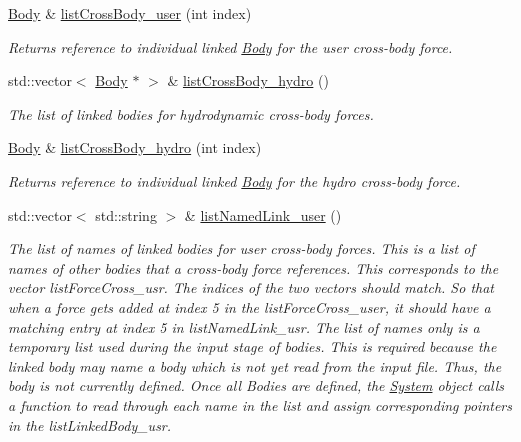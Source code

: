 \begin{DoxyCompactItemize}
\hyperlink{classosea_1_1ofreq_1_1_body}{Body} \& \hyperlink{classosea_1_1ofreq_1_1_body_afaf64ab1b477ff157f31e6824be1b767}{list\-Cross\-Body\-\_\-user} (int index)
\begin{DoxyCompactList}\small\item\em Returns reference to individual linked \hyperlink{classosea_1_1ofreq_1_1_body}{Body} for the user cross-\/body force. \end{DoxyCompactList}\item 
std\-::vector$<$ \hyperlink{classosea_1_1ofreq_1_1_body}{Body} $\ast$ $>$ \& \hyperlink{classosea_1_1ofreq_1_1_body_a7c930213d83962d4248068c38c589113}{list\-Cross\-Body\-\_\-hydro} ()
\begin{DoxyCompactList}\small\item\em The list of linked bodies for hydrodynamic cross-\/body forces. \end{DoxyCompactList}\item 
\hyperlink{classosea_1_1ofreq_1_1_body}{Body} \& \hyperlink{classosea_1_1ofreq_1_1_body_a9aaac9391781c67198f7b8b5785d4745}{list\-Cross\-Body\-\_\-hydro} (int index)
\begin{DoxyCompactList}\small\item\em Returns reference to individual linked \hyperlink{classosea_1_1ofreq_1_1_body}{Body} for the hydro cross-\/body force. \end{DoxyCompactList}\item 
std\-::vector$<$ std\-::string $>$ \& \hyperlink{classosea_1_1ofreq_1_1_body_a07d8ed6fdf5a4c6ef73b2d39b58403ce}{list\-Named\-Link\-\_\-user} ()
\begin{DoxyCompactList}\small\item\em The list of names of linked bodies for user cross-\/body forces. This is a list of names of other bodies that a cross-\/body force references. This corresponds to the vector list\-Force\-Cross\-\_\-usr. The indices of the two vectors should match. So that when a force gets added at index 5 in the list\-Force\-Cross\-\_\-user, it should have a matching entry at index 5 in list\-Named\-Link\-\_\-usr. The list of names only is a temporary list used during the input stage of bodies. This is required because the linked body may name a body which is not yet read from the input file. Thus, the body is not currently defined. Once all Bodies are defined, the \hyperlink{classosea_1_1ofreq_1_1_system}{System} object calls a function to read through each name in the list and assign corresponding pointers in the list\-Linked\-Body\-\_\-usr. \end{DoxyCompactList}\item 

\end{DoxyCompactItemize}

